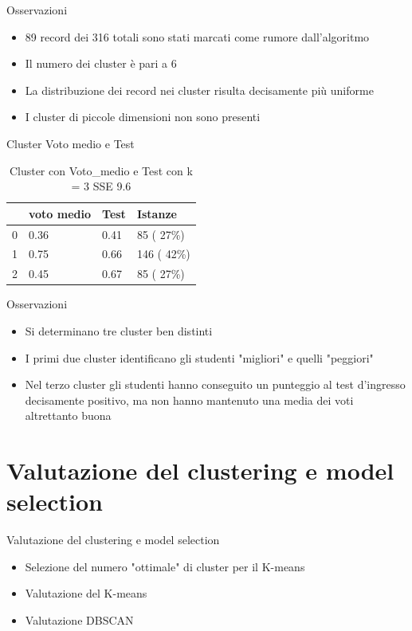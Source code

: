 \documentclass{beamer}
\begin{document}
\begin{frame}{Osservazioni}
  \begin{itemize}
    \item 89 record dei 316 totali sono stati marcati come rumore dall’algoritmo
    \item Il numero dei cluster è pari a 6
    \item La distribuzione dei record nei cluster risulta decisamente più uniforme
    \item I cluster di piccole dimensioni non sono presenti
  \end{itemize}
\end{frame}

\begin{frame}{Cluster Voto medio e Test}
  \begin{table}[ht]
    \centering
    \begin{tabular}{@{}llll@{}}
    \toprule
      & voto medio & Test  & Istanze\\ \midrule
    0 & 0.36       & 0.41  & 85  ( 27\%)\\
    1 & 0.75       & 0.66  & 146 ( 42\%)\\
    2 & 0.45       & 0.67  & 85  ( 27\%)\\ \bottomrule
    \end{tabular}
    \caption{Cluster con Voto\_medio e Test con k = 3 SSE 9.6}
    \label{c3MT}
  \end{table}
\end{frame}

\begin{frame}{Osservazioni}
  \begin{itemize}
    \item Si determinano tre cluster ben distinti
    \item I primi due cluster identificano gli studenti "migliori" e quelli "peggiori"
    \item Nel terzo cluster gli studenti hanno conseguito un punteggio al test d’ingresso decisamente positivo, ma non hanno mantenuto una media dei voti altrettanto buona
  \end{itemize}
\end{frame}

\section{Valutazione del clustering e model selection}

\begin{frame}{Valutazione del clustering e model selection} 
    \begin{itemize}
      \item Selezione del numero "ottimale" di cluster per il K-means
      \item Valutazione del K-means
      \item Valutazione DBSCAN
    \end{itemize} 
\end{frame}
\end{document}
